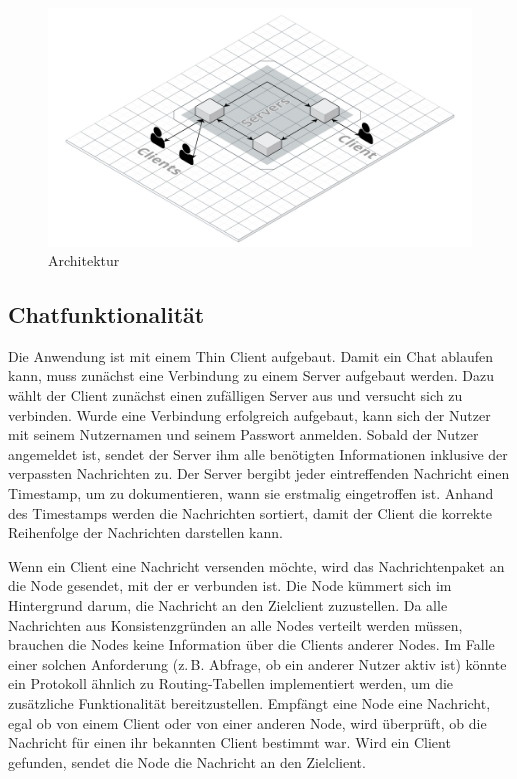 
\begin{figure}[h]
    \centering
    \includegraphics[width=\textwidth]{architecture.png}
    
    \caption{Architektur}
\end{figure}

\author{Matthias Vonend}
\subsection{Chatfunktionalität}\label{Chatfunktionalitaet}
Die Anwendung ist mit einem Thin Client aufgebaut. Damit ein Chat ablaufen kann, muss zunächst eine Verbindung zu einem Server aufgebaut werden.
Dazu wählt der Client zunächst einen zufälligen Server aus und versucht sich zu verbinden.
Wurde eine Verbindung erfolgreich aufgebaut, kann sich der Nutzer mit seinem Nutzernamen und seinem Passwort anmelden.
Sobald der Nutzer angemeldet ist, sendet der Server ihm alle benötigten Informationen inklusive der verpassten
Nachrichten zu. Der Server bergibt jeder eintreffenden Nachricht einen Timestamp, um zu dokumentieren, wann sie erstmalig eingetroffen ist.
Anhand des Timestamps werden die Nachrichten sortiert, damit der Client die korrekte Reihenfolge der Nachrichten darstellen kann.

Wenn ein Client eine Nachricht versenden möchte, wird das Nachrichtenpaket an die Node gesendet, mit der er verbunden ist.
Die Node kümmert sich im Hintergrund darum, die Nachricht an den Zielclient zuzustellen. 
Da alle Nachrichten aus Konsistenzgründen an alle Nodes verteilt werden müssen,
brauchen die Nodes keine Information über die Clients anderer Nodes. Im Falle einer solchen Anforderung
(z.\,B. Abfrage, ob ein anderer Nutzer aktiv ist) könnte ein Protokoll ähnlich zu Routing-Tabellen implementiert werden, um die zusätzliche Funktionalität bereitzustellen.
Empfängt eine Node eine Nachricht, egal ob von einem Client oder von einer anderen Node,
wird überprüft, ob die Nachricht für einen ihr bekannten Client bestimmt war. Wird ein Client gefunden, sendet die Node die Nachricht an den Zielclient.

